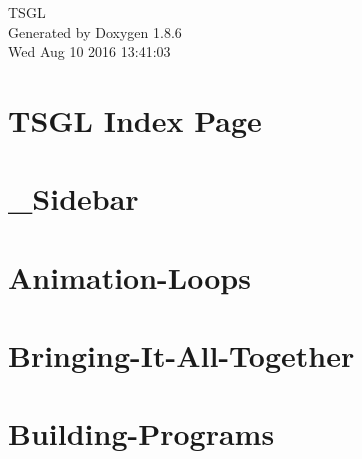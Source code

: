 \documentclass[twoside]{book}
\newcommand{\clearemptydoublepage}{%
  \newpage{\pagestyle{empty}\cleardoublepage}%
}
\begin{document}
\hypersetup{pageanchor=false}
\begin{titlepage}
\vspace*{7cm}
\begin{center}%
{\Large T\-S\-G\-L }\\
\vspace*{1cm}
{\large Generated by Doxygen 1.8.6}\\
\vspace*{0.5cm}
{\small Wed Aug 10 2016 13:41:03}\\
\end{center}
\end{titlepage}
\clearemptydoublepage
\tableofcontents
\clearemptydoublepage
{}
\hypersetup{pageanchor=true}

\chapter{T\-S\-G\-L Index Page}
\label{index}\hypertarget{index}{}
\chapter{\-\_\-\-Sidebar}
\label{md__home_kodemonkey_workspace__t_s_g_l_docs-wiki___sidebar}
\hypertarget{md__home_kodemonkey_workspace__t_s_g_l_docs-wiki___sidebar}{}

\chapter{Animation-\/\-Loops}
\label{md__home_kodemonkey_workspace__t_s_g_l_docs-wiki__animation-_loops}
\hypertarget{md__home_kodemonkey_workspace__t_s_g_l_docs-wiki__animation-_loops}{}

\chapter{Bringing-\/\-It-\/\-All-\/\-Together}
\label{md__home_kodemonkey_workspace__t_s_g_l_docs-wiki__bringing-_it-_all-_together}
\hypertarget{md__home_kodemonkey_workspace__t_s_g_l_docs-wiki__bringing-_it-_all-_together}{}

\chapter{Building-\/\-Programs}
\label{md__home_kodemonkey_workspace__t_s_g_l_docs-wiki__building-_programs}
\hypertarget{md__home_kodemonkey_workspace__t_s_g_l_docs-wiki__building-_programs}{}

\end{document}
